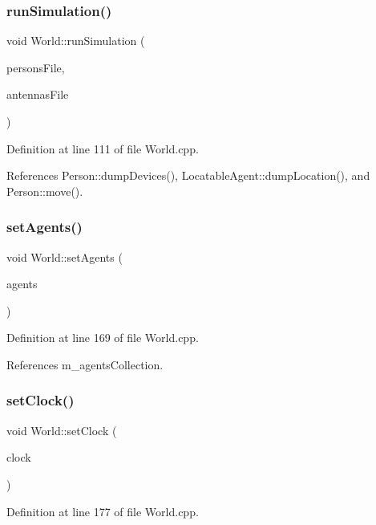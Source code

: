\subsubsection{runSimulation()}
{\footnotesize\ttfamily void World\+::run\+Simulation (\begin{DoxyParamCaption}\item[{string \&}]{persons\+File,  }\item[{string \&}]{antennas\+File }\end{DoxyParamCaption})\hspace{0.3cm}{\ttfamily [noexcept]}}



Definition at line 111 of file World.\+cpp.



References Person\+::dump\+Devices(), Locatable\+Agent\+::dump\+Location(), and Person\+::move().

\mbox{\label{class_world_afa8e5c2943c72aa664590abbb024896b}} 
\subsubsection{setAgents()}
{\footnotesize\ttfamily void World\+::set\+Agents (\begin{DoxyParamCaption}\item[{\textbf{ Agents\+Collection} $\ast$}]{agents }\end{DoxyParamCaption})}



Definition at line 169 of file World.\+cpp.



References m\+\_\+agents\+Collection.

\mbox{\label{class_world_a52ebe3eed240fe4dd37915a1dad02efd}} 
\subsubsection{setClock()}
{\footnotesize\ttfamily void World\+::set\+Clock (\begin{DoxyParamCaption}\item[{\textbf{ Clock} $\ast$}]{clock }\end{DoxyParamCaption})}



Definition at line 177 of file World.\+cpp.



